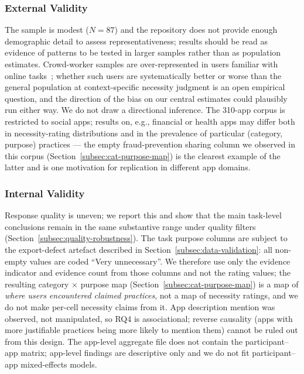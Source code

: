 \documentclass[11pt,a4paper]{article}
\begin{document}
\subsubsection{External Validity}
The sample is modest ($N=87$) and the repository does not provide
enough demographic detail to assess representativeness; results
should be read as evidence of patterns to be tested in larger samples
rather than as population estimates. Crowd-worker samples are
over-represented in users familiar with online
tasks~\citep{kang:etal:2015}; whether such users are systematically
better or worse than the general population at context-specific
necessity judgment is an open empirical question, and the direction
of the bias on our central estimates could plausibly run either way.
We do not draw a directional inference. The 310-app corpus is
restricted to social apps; results on, e.g., financial or health
apps may differ both in necessity-rating distributions and in the
prevalence of particular (category, purpose) practices --- the
empty fraud-prevention sharing column we observed in this corpus
(Section~\ref{subsec:cat-purpose-map}) is the clearest example of
the latter and is one motivation for replication in different app
domains.

\subsubsection{Internal Validity}

Response quality is uneven; we report this and show that the main
task-level conclusions remain in the same substantive range under
quality filters (Section~\ref{subsec:quality-robustness}). The task
purpose columns are subject to the export-defect artefact described
in Section~\ref{subsec:data-validation}: all non-empty values are
coded ``Very unnecessary''. We therefore use only the evidence
indicator and evidence count from those columns and not the rating
values; the resulting category $\times$ purpose map
(Section~\ref{subsec:cat-purpose-map}) is a map of \emph{where users
encountered claimed practices}, not a map of necessity ratings, and we
do not make per-cell necessity claims from it. App
description mention was observed, not manipulated, so RQ4 is
associational; reverse causality (apps with more justifiable practices
being more likely to mention them) cannot be ruled out from this
design. The app-level aggregate file does not contain the
participant--app matrix; app-level findings are descriptive only and
we do not fit participant--app mixed-effects models.
\end{document}
